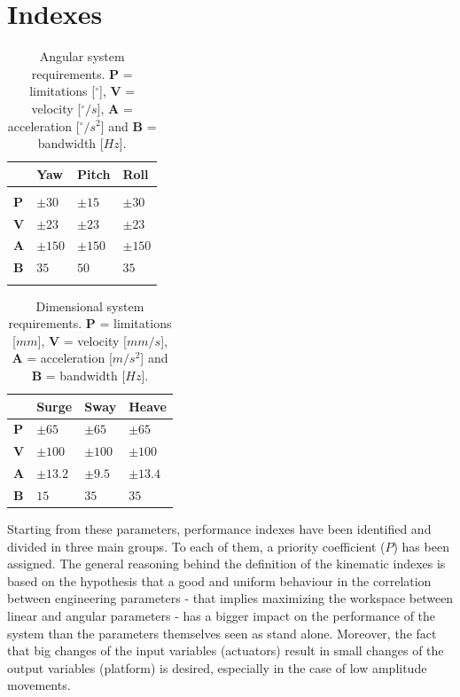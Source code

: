 \documentclass[10.5pt, twocolumn]{article}
\begin{document}
\section{Indexes}
\begin{table}[h]
\centering
\begin{tabular}{C{0.5cm}C{1.3cm}C{1.3cm}C{1.3cm}}
	& \textbf{Yaw} & \textbf{Pitch} & \textbf{Roll} \\
	\hline
	\hline
	\\
	\textbf{P} & \( \pm 30 \) & \( \pm 15 \) & \( \pm 30 \) \\
	\textbf{V} & \( \pm 23 \) & \( \pm 23 \) & \( \pm 23 \) \\
	\textbf{A} & \( \pm 150 \) & \( \pm 150 \) & \( \pm 150 \) \\
	\textbf{B} & \( 35 \) & \( 50 \) & \( 35 \) \\
	\\
	\hline
\end{tabular}
\caption{Angular system requirements. \textbf{P} = limitations [\( ^\circ \)], \textbf{V} = velocity [\( ^\circ/s \)], \textbf{A} = acceleration [\( ^\circ/s^2 \)] and \textbf{B} = bandwidth [\( Hz \)].}
\label{t:SystemRequirements1}
\end{table}
\begin{table}[h]
\centering
\begin{tabular}{C{0.5cm}C{1.3cm}C{1.3cm}C{1.3cm}}
	& \textbf{Surge} & \textbf{Sway} & \textbf{Heave}\\
	\hline
	\hline
	\vspace{0.05cm}\textbf{P} & \vspace{0.05cm}\( \pm 65 \) & \vspace{0.05cm}\( \pm 65 \) & \vspace{0.05cm}\( \pm 65 \) \\
	\textbf{V} & \( \pm 100 \) & \( \pm 100 \) & \( \pm 100 \) \\
	\textbf{A} & \( \pm 13.2 \) & \( \pm 9.5 \) & \( \pm 13.4 \) \\
	\textbf{B} & \( 15 \) & \( 35 \) & \( 35 \)
	\vspace{0.15cm} \\
	\hline
\end{tabular}
\caption{Dimensional system requirements. \textbf{P} = limitations [\( mm \)], \textbf{V} = velocity [\( mm/s \)], \textbf{A} = acceleration [\( m/s^2 \)] and \textbf{B} = bandwidth [\( Hz \)].}
\label{t:SystemRequirements2}
\end{table}

Starting from these parameters, performance indexes have been identified and divided in three main groups. To each of them, a priority coefficient (\( P \)) has been assigned.
The general reasoning behind the definition of the kinematic indexes is based on the hypothesis that a good and uniform behaviour in the correlation between engineering parameters - that implies maximizing the workspace between linear and angular parameters - has a bigger impact on the performance of the system than the parameters themselves seen as stand alone.
Moreover, the fact that big changes of the input variables (actuators) result in small changes of the output variables (platform) is desired, especially in the case of low amplitude movements.
\end{document}
